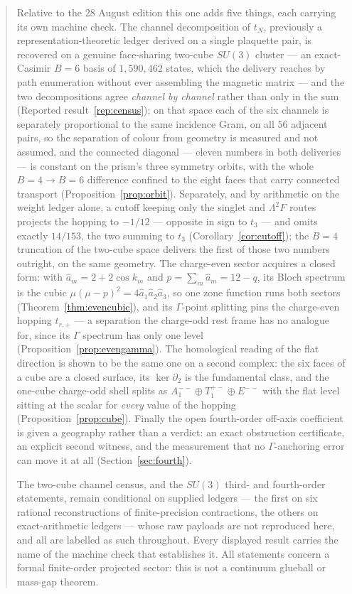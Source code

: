 \documentclass[10pt,twocolumn]{article}
\theoremstyle{plain}
\theoremstyle{definition}
\theoremstyle{remark}
\begin{document}
\begin{abstract}
Relative to the 28 August edition this one adds five things, each carrying its
own machine check. The channel decomposition of $t_N$, previously a
representation-theoretic ledger derived on a single plaquette pair, is recovered on a
genuine face-sharing two-cube $SU(3)$ cluster --- an exact-Casimir $B=6$ basis
of $1{,}590{,}462$ states, which the delivery reaches by path enumeration
without ever assembling the magnetic matrix --- and the
two decompositions agree \emph{channel by channel} rather than only in the sum
(Reported result~\ref{rep:census}); on that space each of the six channels is
separately proportional to the same incidence Gram, on all $56$ adjacent pairs,
so the separation of colour from geometry is measured and not assumed, and the
connected diagonal --- eleven numbers in both deliveries --- is constant on the
prism's three symmetry orbits, with the whole $B=4\to B=6$ difference confined
to the eight faces that carry connected transport
(Proposition~\ref{prop:orbit}).
Separately, and by arithmetic on the weight
ledger alone, a cutoff keeping only
the singlet and $\Lambda^2F$ routes projects the hopping to $-1/12$ ---
opposite in sign to $t_3$ --- and omits exactly $14/153$, the two summing to
$t_3$ (Corollary~\ref{cor:cutoff}); the $B=4$ truncation of the two-cube space
delivers the first of those two numbers outright, on the same geometry. The charge-even sector acquires a closed form:
with $\hat a_m=2+2\cos k_m$ and $p=\sum_m\hat a_m=12-q$, its Bloch spectrum is
the cubic $\mu(\mu-p)^2=4\hat a_1\hat a_2\hat a_3$, so one zone function runs
both sectors (Theorem~\ref{thm:evencubic}), and its
$\Gamma$-point splitting pins the charge-even hopping $t_{r,+}$ --- a
separation the charge-odd rest frame has no analogue for, since its
$\Gamma$ spectrum has only one level (Proposition~\ref{prop:evengamma}). The
homological reading of the flat direction is shown to be the same one on a
second complex: the six faces of a cube are a closed surface, its
$\ker\partial_2$ is the fundamental class, and the one-cube charge-odd shell
splits as $A_1^{--}\oplus T_1^{+-}\oplus E^{--}$ with the flat level sitting at
the scalar for \emph{every} value of the hopping
(Proposition~\ref{prop:cube}). Finally the open
fourth-order off-axis coefficient is given a geography rather than a verdict:
an exact obstruction certificate, an explicit second witness, and the
measurement that no $\Gamma$-anchoring error can move it at all
(Section~\ref{sec:fourth}).

The two-cube channel census, and the $SU(3)$ third- and fourth-order
statements, remain conditional on supplied ledgers --- the first on six
rational reconstructions of finite-precision contractions, the others on
exact-arithmetic ledgers --- whose raw payloads are not reproduced here, and
all are labelled as such throughout. Every displayed result carries the name of the
machine check that establishes it. All statements concern a formal
finite-order projected sector: this is not a continuum glueball or mass-gap
theorem.
\end{abstract}
\end{document}
